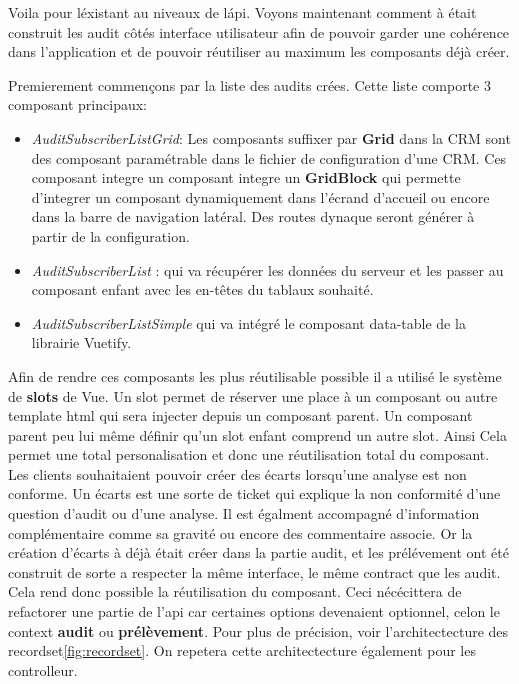 Voila pour l\'existant au niveaux de l\'api. Voyons maintenant comment à était construit les audit côtés interface utilisateur afin de pouvoir garder une cohérence dans l'application et de pouvoir réutiliser au maximum les composants déjà créer. 

Premierement commençons par la liste des audits crées. Cette liste comporte 3 composant principaux: 
\begin{itemize}
    \item  \textit{AuditSubscriberListGrid}: Les composants suffixer par \textbf{Grid} dans la CRM sont des composant paramétrable dans le fichier de configuration d'une CRM. Ces composant integre un composant integre un \textbf{GridBlock} qui permette d'integrer un composant dynamiquement dans l'écrand d'accueil ou encore dans la barre de navigation latéral. Des routes dynaque seront générer à partir de la configuration.
    \item \textit{AuditSubscriberList} : qui va récupérer les données du serveur et les passer au composant enfant avec les en-têtes du tablaux souhaité.  
    \item \textit{AuditSubscriberListSimple} qui va intégré le composant data-table de la librairie Vuetify. 
\end{itemize}

Afin de rendre ces composants les plus réutilisable possible il a utilisé le système de \textbf{slots}\cite{vueslots} de Vue. Un slot permet de réserver une place à un composant ou autre template html qui sera injecter depuis un composant parent. Un composant parent peu lui même définir qu'un slot enfant comprend un autre slot. Ainsi Cela permet une total personalisation et donc une réutilisation total du composant. 
Les clients souhaitaient pouvoir créer des écarts lorsqu'une analyse est non conforme.
Un écarts est une sorte de ticket qui explique la non conformité d'une question d'audit ou d'une analyse. Il est égalment accompagné d'information complémentaire comme sa gravité ou encore des commentaire associe. Or la création d'écarts à déjà était créer dans la partie audit, et les prélévement ont été construit de sorte a respecter la même interface, le même contract que les audit. Cela rend donc possible la  réutilisation du composant. Ceci nécécittera de refactorer une partie de l'api car certaines options devenaient optionnel, celon le context \textbf{audit} ou \textbf{prélèvement}. Pour plus de précision, voir l'architectecture des recordset\ref{fig:recordset}. On repetera cette architectecture également pour les controlleur.

